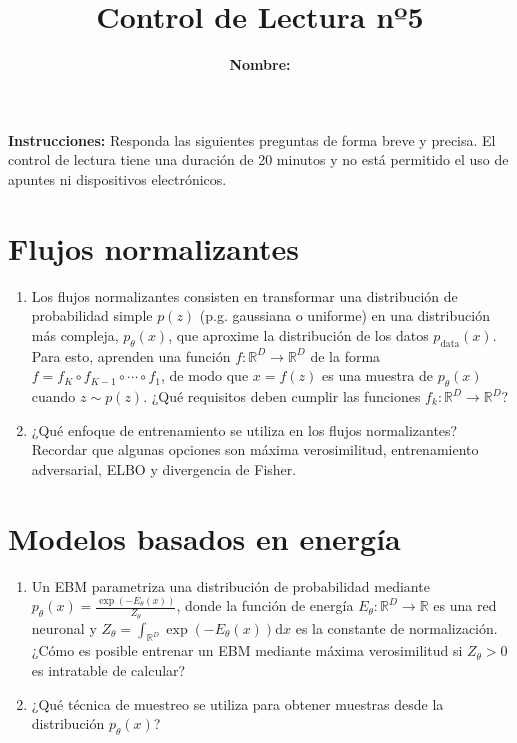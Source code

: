 \documentclass{article}
\title{\bfseries{Control de Lectura nº5}\vspace{0.5cm}}
\author{\textbf{Nombre:} \rule{12cm}{0.4pt}}
\newcommand{\R}{\mathbb{R}}
\begin{document}
\maketitle

\hspace{-0.5cm}\textbf{Instrucciones:} Responda las siguientes preguntas de forma breve y precisa. El control de lectura tiene una duración de 20 minutos y no está permitido el uso de apuntes ni dispositivos electrónicos.

\section*{Flujos normalizantes}
\begin{enumerate}[{\bf P1.}]
	\item Los flujos normalizantes consisten en transformar una distribución de probabilidad simple $p(z)$ (p.g. gaussiana o uniforme) en una distribución más compleja, $p_\theta(x)$, que aproxime la distribución de los datos $p_\text{data}(x)$. Para esto, aprenden una función $f:\R^D\to\R^D$ de la forma $f = f_K\circ f_{K-1}\circ\cdots\circ f_1$, de modo que $x=f(z)$ es una muestra de $p_\theta(x)$ cuando $z\sim p(z)$. ¿Qué requisitos deben cumplir las funciones $f_k:\R^D\to\R^D$?
	\item ¿Qué enfoque de entrenamiento se utiliza en los flujos normalizantes? Recordar que algunas opciones son máxima verosimilitud, entrenamiento adversarial, ELBO y divergencia de Fisher.
\end{enumerate}

\section*{Modelos basados en energía}
\begin{enumerate}[{\bf P1.}]
	\item Un EBM parametriza una distribución de probabilidad mediante $p_\theta(x)=\frac{\exp\left(-E_\theta(x)\right)}{Z_\theta}$, donde la función de energía $E_\theta:\R^D\to\R$ es una red neuronal y $Z_\theta=\int_{\R^D} \exp\left(-E_\theta(x)\right)\text{d}x$ es la constante de normalización. ¿Cómo es posible entrenar un EBM mediante máxima verosimilitud si $Z_\theta>0$ es intratable de calcular?
	\item ¿Qué técnica de muestreo se utiliza para obtener muestras desde la distribución $p_\theta(x)$?
\end{enumerate}
\end{document}
